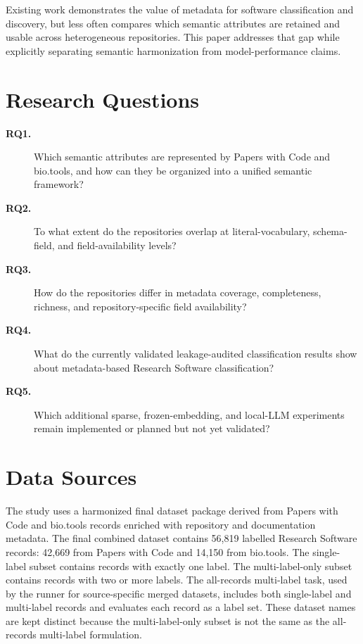 \documentclass[pdflatex,sn-mathphys-num]{sn-jnl}
\theoremstyle{thmstyleone}%
\theoremstyle{thmstyletwo}%
\theoremstyle{thmstylethree}%
\begin{document}
Existing work demonstrates the value of metadata for software classification and discovery, but less often compares which semantic attributes are retained and usable across heterogeneous repositories. This paper addresses that gap while explicitly separating semantic harmonization from model-performance claims.

\section{Research Questions}
\label{sec:rq}

\begin{description}
\item[\textbf{RQ1.}] Which semantic attributes are represented by Papers with Code and bio.tools, and how can they be organized into a unified semantic framework?
\item[\textbf{RQ2.}] To what extent do the repositories overlap at literal-vocabulary, schema-field, and field-availability levels?
\item[\textbf{RQ3.}] How do the repositories differ in metadata coverage, completeness, richness, and repository-specific field availability?
\item[\textbf{RQ4.}] What do the currently validated leakage-audited classification results show about metadata-based Research Software classification?
\item[\textbf{RQ5.}] Which additional sparse, frozen-embedding, and local-LLM experiments remain implemented or planned but not yet validated?
\end{description}

\section{Data Sources}
\label{sec:data}

The study uses a harmonized final dataset package derived from Papers with Code and bio.tools records enriched with repository and documentation metadata. The final combined dataset contains 56,819 labelled Research Software records: 42,669 from Papers with Code and 14,150 from bio.tools. The single-label subset contains records with exactly one label. The multi-label-only subset contains records with two or more labels. The all-records multi-label task, used by the runner for source-specific merged datasets, includes both single-label and multi-label records and evaluates each record as a label set. These dataset names are kept distinct because the multi-label-only subset is not the same as the all-records multi-label formulation.
\end{document}
